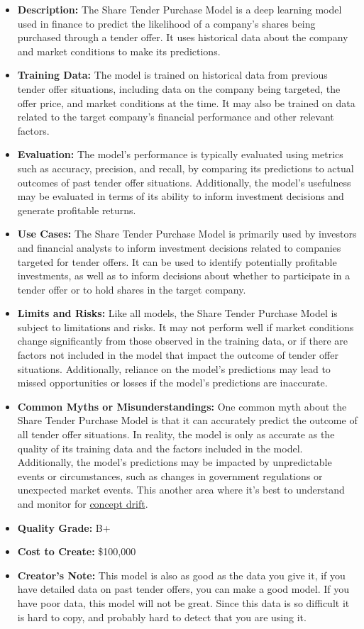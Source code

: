 \begin{itemize}
    \item \textbf{Description:} The Share Tender Purchase Model is a deep learning model used in finance to predict the likelihood of a company's shares being purchased through a tender offer. It uses historical data about the company and market conditions to make its predictions.
    \item \textbf{Training Data:} The model is trained on historical data from previous tender offer situations, including data on the company being targeted, the offer price, and market conditions at the time. It may also be trained on data related to the target company's financial performance and other relevant factors.
    \item \textbf{Evaluation:} The model's performance is typically evaluated using metrics such as accuracy, precision, and recall, by comparing its predictions to actual outcomes of past tender offer situations. Additionally, the model's usefulness may be evaluated in terms of its ability to inform investment decisions and generate profitable returns.
    \item \textbf{Use Cases:} The Share Tender Purchase Model is primarily used by investors and financial analysts to inform investment decisions related to companies targeted for tender offers. It can be used to identify potentially profitable investments, as well as to inform decisions about whether to participate in a tender offer or to hold shares in the target company.
    \item \textbf{Limits and Risks:} Like all models, the Share Tender Purchase Model is subject to limitations and risks. It may not perform well if market conditions change significantly from those observed in the training data, or if there are factors not included in the model that impact the outcome of tender offer situations. Additionally, reliance on the model's predictions may lead to missed opportunities or losses if the model's predictions are inaccurate.
    \item \textbf{Common Myths or Misunderstandings:} One common myth about the Share Tender Purchase Model is that it can accurately predict the outcome of all tender offer situations. In reality, the model is only as accurate as the quality of its training data and the factors included in the model. Additionally, the model's predictions may be impacted by unpredictable events or circumstances, such as changes in government regulations or unexpected market events. This another area where it's best to understand and monitor for \hyperref[sec:drift]{concept drift}.
    \item \textbf{Quality Grade:} B+
    \item \textbf{Cost to Create:} \$100,000
    \item \textbf{Creator's Note:} This model is also as good as the data you give it, if you have detailed data on past tender offers, you can make a good model. If you have poor data, this model will not be great. Since this data is so difficult it is hard to copy, and probably hard to detect that you are using it.
\end{itemize}

